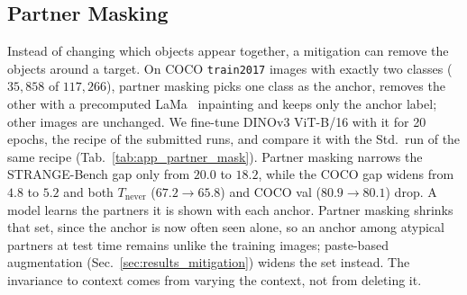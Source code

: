 \subsection{Partner Masking}
\label{app:partner_mask}

\noindent Instead of changing which objects appear together, a mitigation can remove the objects around a target. On COCO \texttt{train2017} images with exactly two classes ($35{,}858$ of $117{,}266$), partner masking picks one class as the anchor, removes the other with a precomputed LaMa~\cite{suvorov2022resolution} inpainting and keeps only the anchor label; other images are unchanged. We fine-tune DINOv3 ViT-B/16 with it for 20 epochs, the recipe of the submitted runs, and compare it with the Std.\ run of the same recipe (Tab.~\ref{tab:app_partner_mask}). Partner masking narrows the STRANGE-Bench gap only from $20.0$ to $18.2$, while the COCO gap widens from $4.8$ to $5.2$ and both $T_{\text{never}}$ ($67.2 \rightarrow 65.8$) and COCO val ($80.9 \rightarrow 80.1$) drop. A model learns the partners it is shown with each anchor. Partner masking shrinks that set, since the anchor is now often seen alone, so an anchor among atypical partners at test time remains unlike the training images; paste-based augmentation (Sec.~\ref{sec:results_mitigation}) widens the set instead. The invariance to context comes from varying the context, not from deleting it.

\begin{table}[!htp]%
\centering
\small
\caption{\textbf{Partner masking against the matched Std.\ run.} Removing the partner narrows the STRANGE-Bench gap slightly but widens the COCO gap and lowers $T_{\text{never}}$ and COCO accuracy. DINOv3 ViT-B/16 fine-tuned for 20 epochs (the submission recipe), F1$_{\text{micro}}$. Better value per column in bold.}
\label{tab:app_partner_mask}

\end{table}
